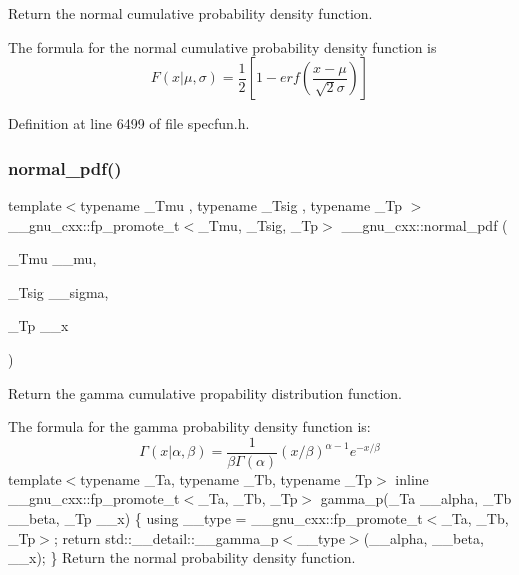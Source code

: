 Return the normal cumulative probability density function. 

The formula for the normal cumulative probability density function is \[ F(x|\mu,\sigma) = \frac{1}{2}\left[ 1-erf(\frac{x-\mu}{\sqrt{2}\sigma}) \right] \] 

Definition at line 6499 of file specfun.\+h.

\mbox{\label{group__gnu__math__spec__func_gab795379781dea732cbc7556351760401}} 
\subsubsection{\texorpdfstring{normal\+\_\+pdf()}{normal\_pdf()}}
{\footnotesize\ttfamily template$<$typename \+\_\+\+Tmu , typename \+\_\+\+Tsig , typename \+\_\+\+Tp $>$ \\
\+\_\+\+\_\+gnu\+\_\+cxx\+::fp\+\_\+promote\+\_\+t$<$\+\_\+\+Tmu, \+\_\+\+Tsig, \+\_\+\+Tp$>$ \+\_\+\+\_\+gnu\+\_\+cxx\+::normal\+\_\+pdf (\begin{DoxyParamCaption}\item[{\+\_\+\+Tmu}]{\+\_\+\+\_\+mu,  }\item[{\+\_\+\+Tsig}]{\+\_\+\+\_\+sigma,  }\item[{\+\_\+\+Tp}]{\+\_\+\+\_\+x }\end{DoxyParamCaption})\hspace{0.3cm}{\ttfamily [inline]}}



Return the gamma cumulative propability distribution function. 

The formula for the gamma probability density function is\+: \[ \Gamma(x|\alpha,\beta) = \frac{1}{\beta\Gamma(\alpha)} (x/\beta)^{\alpha - 1} e^{-x/\beta} \] template$<$typename \+\_\+\+Ta, typename \+\_\+\+Tb, typename \+\_\+\+Tp$>$ inline \+\_\+\+\_\+gnu\+\_\+cxx\+::fp\+\_\+promote\+\_\+t$<$\+\_\+\+Ta, \+\_\+\+Tb, \+\_\+\+Tp$>$ gamma\+\_\+p(\+\_\+\+Ta \+\_\+\+\_\+alpha, \+\_\+\+Tb \+\_\+\+\_\+beta, \+\_\+\+Tp \+\_\+\+\_\+x) \{ using \+\_\+\+\_\+type = \+\_\+\+\_\+gnu\+\_\+cxx\+::fp\+\_\+promote\+\_\+t$<$\+\_\+\+Ta, \+\_\+\+Tb, \+\_\+\+Tp$>$; return std\+::\+\_\+\+\_\+detail\+::\+\_\+\+\_\+gamma\+\_\+p$<$\+\_\+\+\_\+type$>$(\+\_\+\+\_\+alpha, \+\_\+\+\_\+beta, \+\_\+\+\_\+x); \} Return the normal probability density function.

